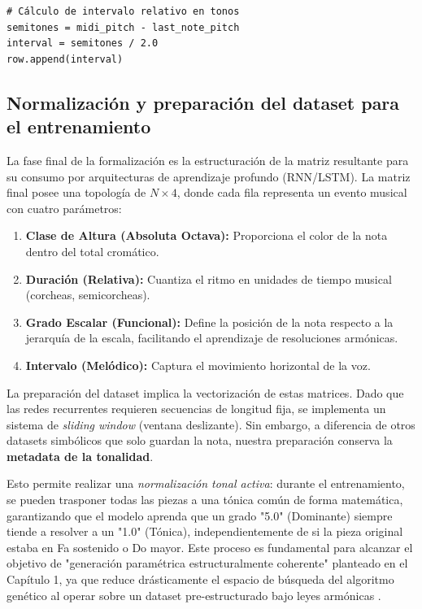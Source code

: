 \documentclass[12pt]{report}
\begin{document}
\begin{verbatim}
# Cálculo de intervalo relativo en tonos
semitones = midi_pitch - last_note_pitch
interval = semitones / 2.0
row.append(interval)
\end{verbatim}

\subsection{Normalización y preparación del dataset para el entrenamiento}

La fase final de la formalización es la estructuración de la matriz resultante para su consumo por arquitecturas de aprendizaje profundo (RNN/LSTM). La matriz final posee una topología de $N \times 4$, donde cada fila representa un evento musical con cuatro parámetros:
\begin{enumerate}
    \item \textbf{Clase de Altura (Absoluta Octava):} Proporciona el color de la nota dentro del total cromático.
    \item \textbf{Duración (Relativa):} Cuantiza el ritmo en unidades de tiempo musical (corcheas, semicorcheas).
    \item \textbf{Grado Escalar (Funcional):} Define la posición de la nota respecto a la jerarquía de la escala, facilitando el aprendizaje de resoluciones armónicas.
    \item \textbf{Intervalo (Melódico):} Captura el movimiento horizontal de la voz.
\end{enumerate}

La preparación del dataset implica la vectorización de estas matrices. Dado que las redes recurrentes requieren secuencias de longitud fija, se implementa un sistema de \textit{sliding window} (ventana deslizante). Sin embargo, a diferencia de otros datasets simbólicos que solo guardan la nota, nuestra preparación conserva la \textbf{metadata de la tonalidad}. 

Esto permite realizar una \textit{normalización tonal activa}: durante el entrenamiento, se pueden trasponer todas las piezas a una tónica común de forma matemática, garantizando que el modelo aprenda que un grado "5.0" (Dominante) siempre tiende a resolver a un "1.0" (Tónica), independientemente de si la pieza original estaba en Fa sostenido o Do mayor. Este proceso es fundamental para alcanzar el objetivo de "generación paramétrica estructuralmente coherente" planteado en el Capítulo 1, ya que reduce drásticamente el espacio de búsqueda del algoritmo genético al operar sobre un dataset pre-estructurado bajo leyes armónicas \cite{hadjeres2017deepbach}.
\end{document}
